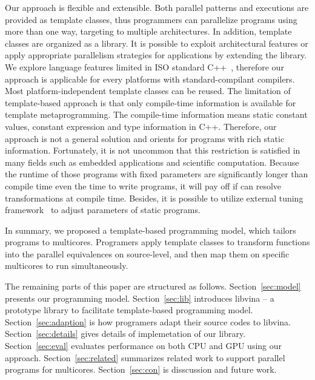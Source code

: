 Our approach is flexible and extensible. Both parallel patterns and
executions are provided as template classes, thus programmers can
parallelize programs using more than one way, targeting to multiple architectures. In addition, template
classes are organized as a library. It is
possible to exploit architectural
features or apply appropriate parallelism strategies for applications
by extending the library. We
explore language features limited in ISO
standard C++~\cite{c++98, c++03, c++0x}, therefore our approach is
applicable for every platforms with standard-compilant compilers. Most 
platform-independent template classes can be reused. The limitation of
template-based approach is that only compile-time
information is available for template metaprogramming. The
compile-time information means static constant values,
constant expression and type information in C++. Therefore, our
approach is not a general solution and orients for programs with rich
static information. Fortunately, it is not uncommon that this
restriction is satisfied in many fields such as embedded applications and
scientific computation. Because the runtime of those programs with fixed
parameters are significantly longer than compile time even the time to
write programs, it will pay off if can resolve transformations at
compile time. Besides, it is possible to utilize external
tuning framework~\cite{tuningfrm} to adjust parameters of static programs.

In summary, we proposed a template-based programming model, which 
tailors programs to multicores. Programers apply template classes to
transform functions into the parallel equivalences on source-level,
and then map them on specific multicores to run simultaneously.

The remaining parts of this paper are structured as follows.
Section~\ref{sec:model} presents our programming model. Section~\ref{sec:lib} introduces libvina
-- a prototype library to facilitate template-based programming model.
Section~\ref{sec:adaption} is how programers adapt their source codes to libvina. Section~\ref{sec:details} gives details of
implemetation of our library. Section~\ref{sec:eval}
evaluates performance on both CPU and GPU using our approach.
Section~\ref{sec:related} summarizes related work to support parallel programs
for multicores. Section~\ref{sec:con} is disscussion and future work.

